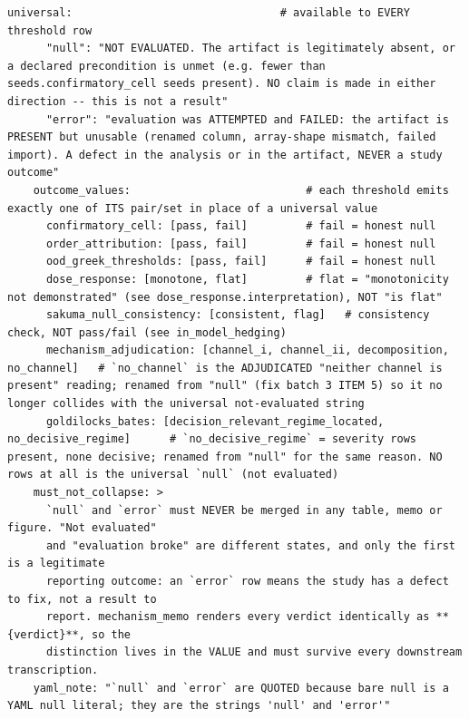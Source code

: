 \documentclass{article}
\begin{document}
\begin{lstlisting}[basicstyle=\ttfamily\tiny,breaklines=true,breakatwhitespace=true,keepspaces=true,columns=fullflexible,postbreak=\mbox{$\hookrightarrow$\space},breakindent=1.5em]
    universal:                                # available to EVERY threshold row
      "null": "NOT EVALUATED. The artifact is legitimately absent, or a declared precondition is unmet (e.g. fewer than seeds.confirmatory_cell seeds present). NO claim is made in either direction -- this is not a result"
      "error": "evaluation was ATTEMPTED and FAILED: the artifact is PRESENT but unusable (renamed column, array-shape mismatch, failed import). A defect in the analysis or in the artifact, NEVER a study outcome"
    outcome_values:                           # each threshold emits exactly one of ITS pair/set in place of a universal value
      confirmatory_cell: [pass, fail]         # fail = honest null
      order_attribution: [pass, fail]         # fail = honest null
      ood_greek_thresholds: [pass, fail]      # fail = honest null
      dose_response: [monotone, flat]         # flat = "monotonicity not demonstrated" (see dose_response.interpretation), NOT "is flat"
      sakuma_null_consistency: [consistent, flag]   # consistency check, NOT pass/fail (see in_model_hedging)
      mechanism_adjudication: [channel_i, channel_ii, decomposition, no_channel]   # `no_channel` is the ADJUDICATED "neither channel is present" reading; renamed from "null" (fix batch 3 ITEM 5) so it no longer collides with the universal not-evaluated string
      goldilocks_bates: [decision_relevant_regime_located, no_decisive_regime]      # `no_decisive_regime` = severity rows present, none decisive; renamed from "null" for the same reason. NO rows at all is the universal `null` (not evaluated)
    must_not_collapse: >
      `null` and `error` must NEVER be merged in any table, memo or figure. "Not evaluated"
      and "evaluation broke" are different states, and only the first is a legitimate
      reporting outcome: an `error` row means the study has a defect to fix, not a result to
      report. mechanism_memo renders every verdict identically as **{verdict}**, so the
      distinction lives in the VALUE and must survive every downstream transcription.
    yaml_note: "`null` and `error` are QUOTED because bare null is a YAML null literal; they are the strings 'null' and 'error'"


\end{lstlisting}
\end{document}
